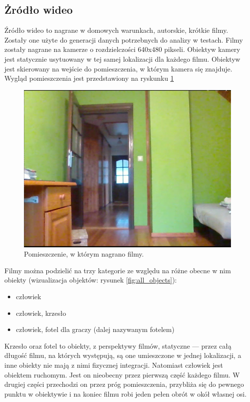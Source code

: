 \subsection{Żródło wideo}
Źródło wideo to nagrane w domowych warunkach, autorskie, krótkie filmy. Zostały one użyte do generacji danych potrzebnych do analizy w testach.
Filmy zostały nagrane na kamerze o rozdzielczości 640x480 pikseli. Obiektyw kamery jest statycznie usytuowany w tej samej lokalizacji dla każdego filmu. Obiektyw jest skierowany na wejście do pomieszczenia, w którym kamera się znajduje. Wygląd pomieszczenia jest przedstawiony na ryskunku \ref{fig:test-dokladnosc-scena}

\begin{figure}[H]
    \centering
    \includegraphics[width=\linewidth]{r_test_dokładności/vid_pics/1_1.png}
    \caption{Pomieszczenie, w którym nagrano filmy.}
    \label{fig:test-dokladnosc-scena}
\end{figure}


Filmy można podzielić na trzy kategorie ze względu na różne obecne w nim obiekty (wizualizacja objektów: rysunek \ref{fig:all_objects}):
\begin{itemize}
    \item człowiek
    \item człowiek, krzesło
    \item człowiek, fotel dla graczy (dalej nazywanym fotelem)
\end{itemize}
Krzesło oraz fotel to obiekty, z perspektywy filmów, statyczne --- przez całą długość filmu, na których występują, są one umieszczone w jednej lokalizacji, a inne obiekty nie mają z nimi fizycznej integracji.
Natomiast człowiek jest obiektem ruchomym. Jest on nieobecny przez pierwszą część każdego filmu. W drugiej części przechodzi on przez próg pomieszczenia, przybliża się do pewnego punktu w obiektywie i na koniec filmu robi jeden pełen obrót w okół własnej osi. 

